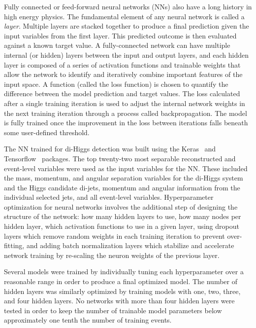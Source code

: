 \label{sec:NN}
Fully connected or feed-forward neural networks (NNs) also have a long history in high energy physics. The fundamental element of any neural network is called a \textit{layer}. Multiple layers are stacked together to produce a final prediction given the input variables from the first layer. This predicted outcome is then evaluated against a known target value. A fully-connected network can have multiple internal (or hidden) layers between the input and output layers, and each hidden layer is composed of a series of activation functions and trainable weights that allow the network to identify and iteratively combine important features of the input space. A function (called the loss function) is chosen to quantify the difference between the model prediction and target values. The loss calculated after a single training iteration is used to adjust the internal network weights in the next training iteration through a process called backpropagation. The model is fully trained once the improvement in the loss between iterations falls beneath some user-defined threshold.

The NN trained for di-Higgs detection was built using the Keras~\cite{chollet2015keras} and Tensorflow~\cite{tensorflow} packages. The top twenty-two most separable reconstructed and event-level variables were used as the input variables for the NN. These included the mass, momentum, and angular separation variables for the di-Higgs system and the Higgs candidate di-jets, momentum and angular information from the individual selected jets, and all event-level variables. Hyperparameter optimization for neural networks involves the additional step of designing the structure of the network: how many hidden layers to use, how many nodes per hidden layer, which activation functions to use in a given layer, using dropout layers which remove random weights in each training iteration to prevent over-fitting, and adding batch normalization layers which stabilize and accelerate network training by re-scaling the neuron weights of the previous layer.

Several models were trained by individually tuning each hyperparameter over a reasonable range in order to produce a final optimized model. The number of hidden layers was similarly optimized by training models with one, two, three, and four hidden layers. No networks with more than four hidden layers were tested in order to keep the number of trainable model parameters below approximately one tenth the number of training events.

